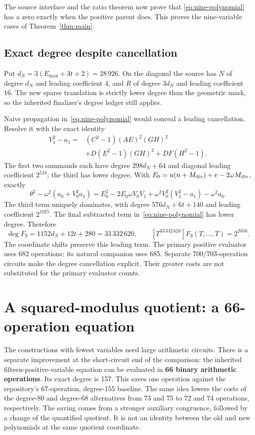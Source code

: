 \documentclass[11pt,letterpaper]{article}
\theoremstyle{remark}\newtheorem{remark}[theorem]{Remark}
\begin{document}
The source interface and the ratio theorem now prove that
\eqref{eq:nine-polynomial} has a zero exactly when the positive parent
does. This proves the nine-variable cases of Theorem~\ref{thm:main}.

\subsection{Exact degree despite cancellation}
Put $d_N=3(E_{\max}+3t+2)=28\,926$.
On the diagonal the source has
$N$ of degree $d_N$ and leading coefficient $4$, and
$R$ of degree $3d_N$ and leading coefficient $16$.
The new sparse translation is strictly lower degree than the geometric
mask, so the inherited finalizer's degree ledger still applies.

Naive propagation in~\eqref{eq:nine-polynomial} would conceal a leading
cancellation. Resolve it with the exact identity
\begin{align*}
 V_1^2-a_1={}&(C^2-1)(AE)^2(GH)^2\\
 &+D(E^2-1)(GH)^2+DF(H^2-1).
\end{align*}
The first two summands each have degree $298d_N+64$ and diagonal
leading coefficient $2^{518}$; the third has lower degree.
With
$E_0=u(n+M_{\rm div})+v-2\omega M_{\rm div}$, exactly
\[
 \theta^2-\omega^2(a_0+V_0^2a_1)
 =E_0^2-2E_0\omega V_0V_1
  +\omega^2V_0^2(V_1^2-a_1)-\omega^2a_0.
\]
The third term uniquely dominates, with degree
$576d_N+6t+140$ and leading coefficient $2^{1025}$.
The final subtracted term in~\eqref{eq:nine-polynomial} has lower degree.
Therefore
\[
 \deg F_9=1152d_N+12t+280=33\,332\,620,
 \qquad [T^{33\,332\,620}]F_9(T,\ldots,T)=2^{2050}.
\]
The coordinate shifts preserve this leading term.
The primary positive evaluator uses 682 operations; its natural
companion uses 685. Separate 700/703-operation circuits make the
degree cancellation explicit. Their greater costs are not substituted
for the primary evaluator counts.

\section{A squared-modulus quotient: a 66-operation equation}
\label{sec:short}

The constructions with fewest variables need large arithmetic circuits.
There is a separate improvement at the short-circuit end of the comparison:
the inherited fifteen-positive-variable equation can be evaluated in
\textbf{66 binary arithmetic operations}.  Its exact degree is 157.  This
saves one operation against the repository's 67-operation, degree-155
baseline.  The same idea lowers the costs of the degree-80 and degree-68
alternatives from 73 and 75 to 72 and 74 operations, respectively.
The saving comes from a stronger auxiliary congruence, followed by a change
of the quantified quotient.  It is not an identity between the old and new
polynomials at the same quotient coordinate.
\end{document}
